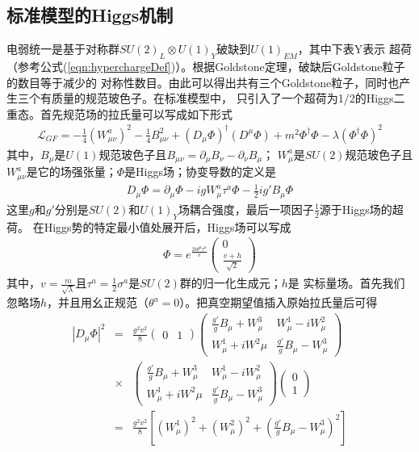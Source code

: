 \subsection{标准模型的Higgs机制}
电弱统一是基于对称群$SU(2)_L\otimes U(1)_Y$破缺到$U(1)_{EM}$，其中下表Y表示
超荷（参考公式(\ref{eqn:hyperchargeDef})）。根据Goldstone定理，破缺后Goldstone粒子的数目等于减少的
对称性数目。由此可以得出共有三个Goldstone粒子，同时也产生三个有质量的规范玻色子。在标准模型中，
只引入了一个超荷为1/2的Higgs二重态。首先规范场的拉氏量可以写成如下形式
\begin{eqnarray}
\mathscr{L}_{GF} = -\frac{1}{4}(W^a_{\mu\nu})^2 -\frac{1}{4}B^2_{\mu\nu} + 
(D_{\mu}\Phi)^{\dagger}(D^{\mu}\Phi)
+ m^2 \Phi^{\dagger}\Phi - \lambda(\Phi^{\dagger}\Phi)^2
\label{eqn:EWLagrangianO}
\end{eqnarray}
其中，$B_{\mu}$是$U(1)$规范玻色子且$B_{\mu\nu} = \partial_{\mu}B_{\nu} - \partial_{\nu}B_{\mu}$；
$W^a_{\mu}$是$SU(2)$规范玻色子且$W^a_{\mu\nu}$是它的场强张量；$\Phi$是Higgs场；协变导数的定义是
\begin{eqnarray}
D_{\mu}\Phi = \partial_{\mu}\Phi -igW^a_{\mu}\tau^a\Phi - \frac{1}{2}ig'B_{\mu}\Phi
\label{eqn:SMCov}
\end{eqnarray}
这里$g$和$g'$分别是$SU(2)$和$U(1)_Y$场耦合强度，最后一项因子$\frac{1}{2}$源于Higgs场的超荷。
在Higgs势的特定最小值处展开后，Higgs场可以写成
\begin{eqnarray}
\Phi = e^{\frac{2i\theta^a\tau^a}{v}}\left(\begin{array}{cc}0 \\ \frac{v+h}{\sqrt{2}}\end{array}\right)
\end{eqnarray}
其中，$v = \frac{m}{\sqrt{\lambda}}$且$\tau^a = \frac{1}{2}\sigma^a$是$SU(2)$群的归一化生成元；$h$是
实标量场。首先我们忽略场$h$，并且用幺正规范（$\theta^a = 0$）。把真空期望值插入原始拉氏量后可得
\begin{eqnarray}
|D_{\mu}\Phi|^2 &=& \frac{g^2v^2}{8}(\begin{array}{cc}0 & 1\end{array}) 
\left( \begin{array}{cc} 
\frac{g'}{g}B_{\mu}+W^3_{\mu} & W^1_{\mu}-iW^2_{\mu} \\ W^1_{\mu}+iW^2{\mu} & \frac{g'}{g}B_{\mu}-W^3_{\mu} 
\end{array} \right)
\nonumber \\
&\times&
\left( \begin{array}{cc} 
\frac{g'}{g}B_{\mu}+W^3_{\mu} & W^1_{\mu}-iW^2_{\mu} \\ W^1_{\mu}+iW^2{\mu} & \frac{g'}{g}B_{\mu}-W^3_{\mu} 
\end{array} \right) 
\left(\begin{array}{cc}0\\1\end{array}\right)
\nonumber \\
&=& \frac{g^2v^2}{8}\left[(W^1_{\mu})^2 + (W^2_{\mu})^2 +(\frac{g'}{g}B_{\mu}-W^3_{\mu})^2 \right]
\end{eqnarray}
